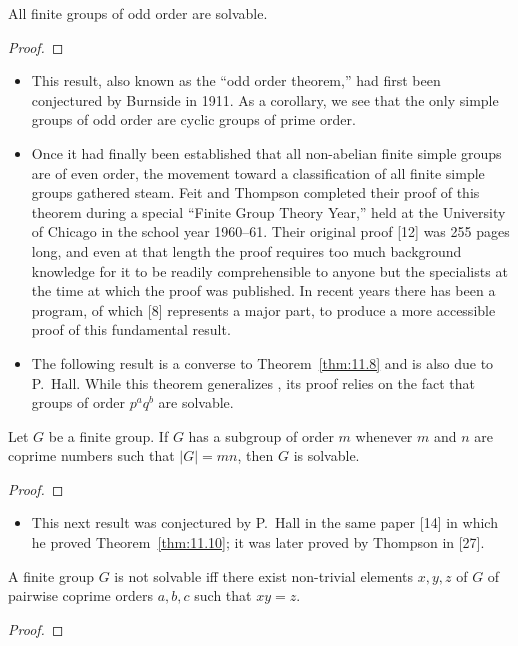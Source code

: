 \documentclass[../Odyssey_Project.tex]{subfiles}
\begin{document}
\begin{namedtheorem}
\label{thm:feit-thompson}
All finite groups of odd order are solvable.
\end{namedtheorem}
\begin{proof}
\end{proof}

\begin{itemize}
    \item This result, also known as the ``odd order theorem,'' had first been conjectured by Burnside in 1911. As a corollary, we see that the only simple groups of odd order are cyclic groups of prime order.
    \item Once it had finally been established that all non-abelian finite simple groups are of even order, the movement toward a classification of all finite simple groups gathered steam. Feit and Thompson completed their proof of this theorem during a special ``Finite Group Theory Year,'' held at the University of Chicago in the school year 1960--61. Their original proof [12] was 255 pages long, and even at that length the proof requires too much background knowledge for it to be readily comprehensible to anyone but the specialists at the time at which the proof was published. In recent years there has been a program, of which [8] represents a major part, to produce a more accessible proof of this fundamental result.
    \item The following result is a converse to Theorem~\ref{thm:11.8} and is also due to P.~Hall. While this theorem generalizes , its proof relies on the fact that groups of order $p^a q^b$ are solvable.
\end{itemize}

\begin{theorem}
\label{thm:11.10}
Let $G$ be a finite group. If $G$ has a subgroup of order $m$ whenever $m$ and $n$ are coprime numbers such that $|G| = mn$, then $G$ is solvable.
\end{theorem}
\begin{proof}
\end{proof}

\begin{itemize}
    \item This next result was conjectured by P.~Hall in the same paper [14] in which he proved Theorem~\ref{thm:11.10}; it was later proved by Thompson in [27].
\end{itemize}

\begin{theorem}
\label{thm:11.11}
A finite group $G$ is not solvable iff there exist non-trivial elements $x, y, z$ of $G$ of pairwise coprime orders $a, b, c$ such that $xy = z$.
\end{theorem}
\begin{proof}
\end{proof}
\end{document}
